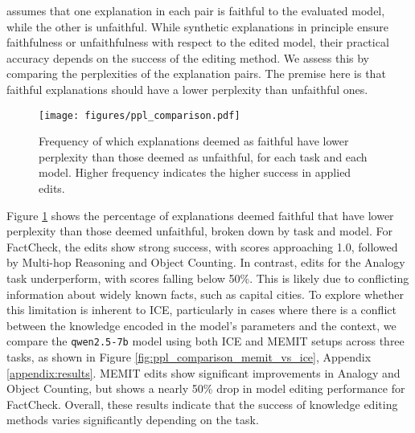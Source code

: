 \methodname assumes that one explanation in each pair is faithful to the evaluated model, while the other is unfaithful. While synthetic explanations in principle ensure faithfulness or unfaithfulness with respect to the edited model, their practical accuracy depends on the success of the editing method. We assess this by comparing the perplexities of the explanation pairs. The premise here is that faithful explanations should have a lower perplexity than unfaithful ones.

\begin{figure}[htb]
    \centering
    \texttt{[image: figures/ppl\_comparison.pdf]}
    \caption{Frequency of which explanations deemed as faithful have lower perplexity than those deemed as unfaithful, for each task and each model. Higher frequency indicates the higher success in applied edits.}
    \label{fig:ppl_comparison}
\end{figure}

Figure \ref{fig:ppl_comparison} shows the percentage of explanations deemed faithful that have lower perplexity than those deemed unfaithful, broken down by task and model. For FactCheck, the edits show strong success, with scores approaching 1.0, followed by Multi-hop Reasoning and Object Counting. In contrast, edits for the Analogy task underperform, with scores falling below 50\%. This is likely due to conflicting information about widely known facts, such as capital cities. To explore whether this limitation is inherent to ICE, particularly in cases where there is a conflict between the knowledge encoded in the model’s parameters and the context, we compare the \texttt{qwen2.5-7b} model using both ICE and MEMIT setups across three tasks, as shown in Figure \ref{fig:ppl_comparison_memit_vs_ice}, Appendix \ref{appendix:results}. MEMIT edits show significant improvements in Analogy and Object Counting, but shows 
a nearly 50\% drop in model editing performance for FactCheck.
Overall, these results indicate that the success of knowledge editing methods varies significantly depending on the task.



